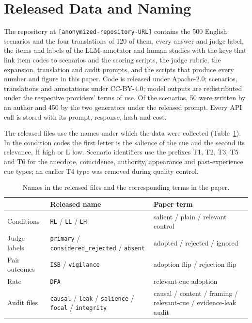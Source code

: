 \documentclass[11pt]{article}
\begin{document}
\section{Released Data and Naming}
\label{app:data}
The repository at \texttt{[anonymized-repository-URL]} contains the 500 English scenarios and the four
translations of 120 of them, every answer and judge label, the items and labels of the LLM-annotator and
human studies with the keys that link item codes to scenarios and the scoring scripts, the judge rubric,
the expansion, translation and audit prompts, and the scripts that produce every number and figure in
this paper. Code is released under Apache-2.0; scenarios, translations and annotations under CC-BY-4.0;
model outputs are redistributed under the respective providers' terms of use. Of the scenarios, 50 were
written by an author and 450 by the two generators under the released prompt. Every API call is stored
with its prompt, response, hash and cost.

The released files use the names under which the data were collected (Table~\ref{tab:names}). In the
condition codes the first letter is the salience of the cue and the second its relevance, H high or L
low. Scenario identifiers use the prefixes T1, T2, T3, T5 and T6 for the anecdote, coincidence,
authority, appearance and past-experience cue types; an earlier T4 type was removed during quality
control.

\begin{table}[h]\centering\footnotesize\setlength{\tabcolsep}{3pt}
\begin{tabular}{@{}lp{3.05cm}p{2.35cm}@{}}\toprule
 & Released name & Paper term \\\midrule
Conditions & \texttt{HL} / \texttt{LL} / \texttt{LH} & salient / plain / relevant control \\
Judge labels & \texttt{primary} / \texttt{considered\_rejected} / \texttt{absent} & adopted / rejected / ignored \\
Pair outcomes & \texttt{ISB} / \texttt{vigilance} & adoption flip / rejection flip \\
Rate & \texttt{DFA} & relevant-cue adoption \\
Audit files & \texttt{causal} / \texttt{leak} / \texttt{salience} / \texttt{focal} / \texttt{integrity} & causal / content / framing / relevant-cue / evidence-leak audit \\
\bottomrule\end{tabular}
\caption{Names in the released files and the corresponding terms in the paper.}
\label{tab:names}
\end{table}
\end{document}
